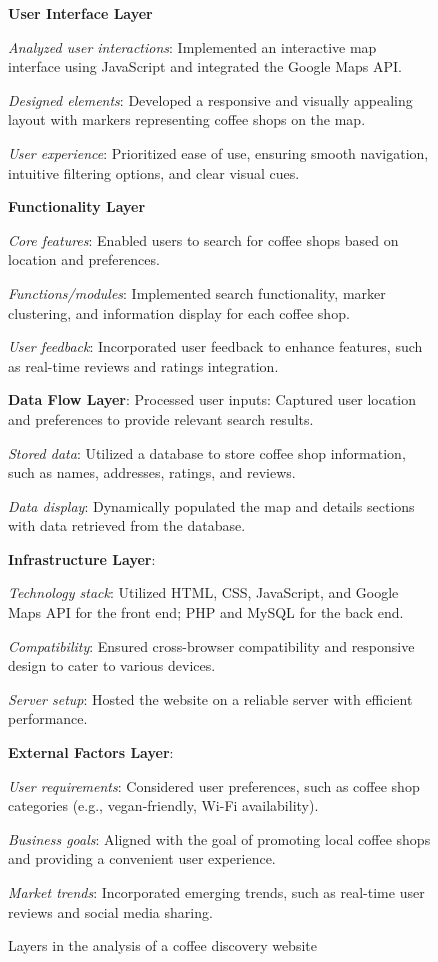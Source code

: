 \documentclass[acmlarge,timestamp]{acmart}
\begin{document}
\begin{figure}[h!]
\begin{mdframed}
\textbf{User Interface Layer}

\textit{Analyzed user interactions}: Implemented an interactive map
interface using JavaScript and integrated the Google Maps API.

\textit{Designed elements}: Developed a responsive and visually appealing
layout with markers representing coffee shops on the map.

\textit{User experience}: Prioritized ease of use, ensuring smooth
navigation, intuitive filtering options, and clear visual cues.

\textbf{Functionality Layer}

\textit{Core features}: Enabled users to search for coffee shops based
on location and preferences.

\textit{Functions/modules}: Implemented search functionality, marker
clustering, and information display for each coffee shop.

\textit{User feedback}: Incorporated user feedback to enhance
features, such as real-time reviews and ratings integration.

\textbf{Data Flow Layer}:
Processed user inputs: Captured user location and
preferences to provide relevant search results.

\textit{Stored data}: Utilized a database to store coffee shop
information, such as names, addresses, ratings, and reviews.

\textit{Data display}: Dynamically populated the map and details
sections with data retrieved from the database.

\textbf{Infrastructure Layer}:

\textit{Technology stack}: Utilized HTML, CSS, JavaScript, and Google
Maps API for the front end; PHP and MySQL for the back end.

\textit{Compatibility}: Ensured cross-browser compatibility and
responsive design to cater to various devices.

\textit{Server setup}: Hosted the website on a reliable server with
efficient performance.

\textbf{External Factors Layer}:

\textit{User requirements}: Considered user preferences, such as
coffee shop categories (e.g., vegan-friendly, Wi-Fi availability).

\textit{Business goals}: Aligned with the goal of promoting local
coffee shops and providing a convenient user experience.

\textit{Market trends}: Incorporated emerging trends, such as
real-time user reviews and social media sharing.

\end{mdframed}
\caption{Layers in the analysis of a coffee discovery website\label{kajol-box}}
\end{figure}
\end{document}
